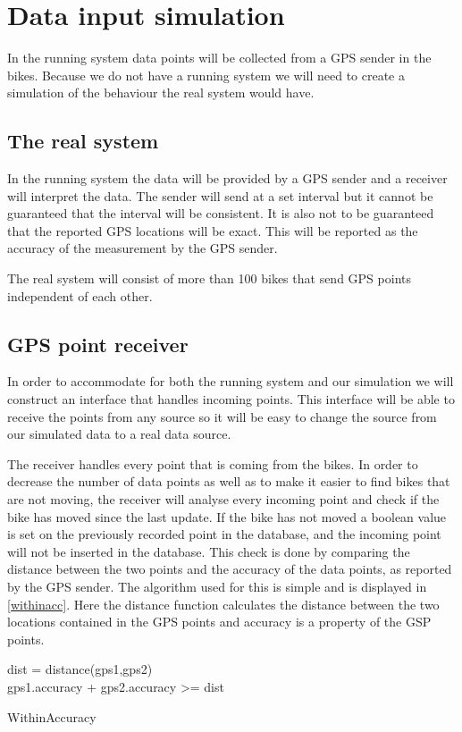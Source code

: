 \section{Data input simulation}

In the running system data points will be collected from a GPS sender in the bikes.
Because we do not have a running system we will need to create a simulation of the behaviour the real system would have.

\subsection{The real system}
In the running system the data will be provided by a GPS sender and a receiver will interpret the data.
The sender will send at a set interval but it cannot be guaranteed that the interval will be consistent. 
It is also not to be guaranteed that the reported GPS locations will be exact.
This will be reported as the accuracy of the measurement by the GPS sender.

The real system will consist of more than 100 bikes that send GPS points independent of each other.

\subsection{GPS point receiver}
In order to accommodate for both the running system and our simulation we will construct an interface that handles incoming points.
This interface will be able to receive the points from any source so it will be easy to change the source from our simulated data to a real data source.

The receiver handles every point that is coming from the bikes.
In order to decrease the number of data points as well as to make it easier to find bikes that are not moving, the receiver will analyse every incoming point and check if the bike has moved since the last update.
If the bike has not moved a boolean value is set on the previously recorded point in the database, and the incoming point will not be inserted in the database.
This check is done by comparing the distance between the two points and the accuracy of the data points, as reported by the GPS sender.
The algorithm used for this is simple and is displayed in \cref{withinacc}.
Here the distance function calculates the distance between the two locations contained in the GPS points and accuracy is a property of the GSP points.

\begin{algorithm}

dist = distance(gps1,gps2)\\
\Return gps1.accuracy + gps2.accuracy >= dist

\caption{WithinAccuracy}
\label{withinacc}
\end{algorithm}

